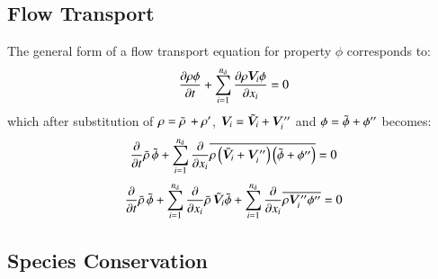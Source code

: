 \documentclass{warpdoc}
\newcommand{\nd}{{{n}_{\rm d}}}
\newcommand{\mfd}{\displaystyle}
\begin{document}
\subsection{Flow Transport}


The general form of a flow transport equation
for property $\phi$ corresponds to:
%
\begin{equation}
  \frac{\partial  \rho  \phi}{\partial t}
   +  \sum_{i=1}^{\nd} \frac{\partial  \rho  \bm{V}_i  \phi}{\partial x_i} =0
  \label{eqn:FT:1}
\end{equation}
%
which after substitution of $\rho=\bar{\rho}\,+\rho^{\prime}$, $\bm{V}_i={\tilde{\bm{V}}_i}+\bm{V}_i^{\prime\prime}$
and $\phi={\tilde{\phi}}+\phi^{\prime\prime}$ becomes:
%
\begin{displaymath}
  \mfd\frac{\partial}{\partial t}  \wbar{\rho}\,  {\wtilde{\phi}}
      +  \sum_{i=1}^{\nd} \frac{\partial }{\partial x_i}  \overline{\rho  \left( {\wtilde{\bm{V}}_i}+\bm{V}_i^{\prime\prime}\right)
        \left( {\wtilde{\phi}}+\phi^{\prime\prime} \right)} = 0 
\end{displaymath}
%
\begin{equation}
  \mfd\frac{\partial}{\partial t}  \wbar{\rho}\,  {\wtilde{\phi}}
      + \sum_{i=1}^{\nd} \frac{\partial }{\partial x_i}
        \wbar{\rho}\, {\wtilde{\bm{V}}_i} {\wtilde{\phi}}
      + \sum_{i=1}^{\nd} \frac{\partial }{\partial x_i}
             \overline{\rho \bm{V}_i^{\prime\prime} \phi^{\prime\prime}}
      = 0 
  \label{eqn:FT:final}
\end{equation}
%







\subsection{Species Conservation}
\end{document}
